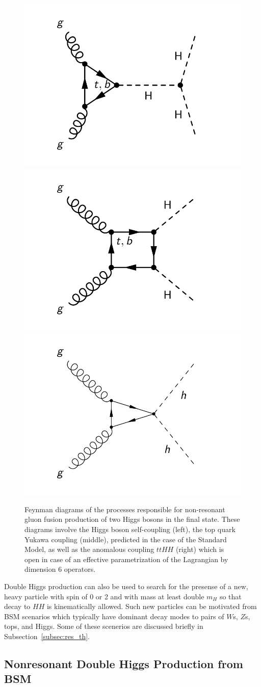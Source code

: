 \begin{figure}
\begin{center}
\includegraphics[width=.32\textwidth]{figures/intro/diHiggs_lambda.pdf}
\includegraphics[width=.32\textwidth]{figures/intro/diHiggs_yt.pdf}
\includegraphics[width=.32\textwidth]{figures/intro/diHiggs_c2.pdf}
\end{center}
\caption{
\label{fig:diHiggs_diagrams}
Feynman diagrams of the processes responsible for non-resonant gluon fusion production of two
Higgs bosons in the final state.
These diagrams involve the Higgs boson self-coupling (left), the top quark Yukawa coupling (middle),
predicted in the case of the Standard Model,
as well as the anomalous coupling $ttHH$ (right) which is open in case of an effective
parametrization of the Lagrangian by dimension 6 operators.}
\end{figure}

Double Higgs production can also be used to search for the presense of a new, heavy particle
with spin of 0 or 2 and with
mass at least double $m_H$ so that decay to $HH$ is kinematically allowed. Such new particles
can be motivated from BSM scenarios which typically have dominant decay modes to pairs of
$W$s, $Z$s, tops, and Higgs. Some of these scenerios are discussed briefly in
Subsection~\ref{subsec:res_th}.

\subsection{Nonresonant Double Higgs Production from BSM\label{subsec:nonres_th}}

